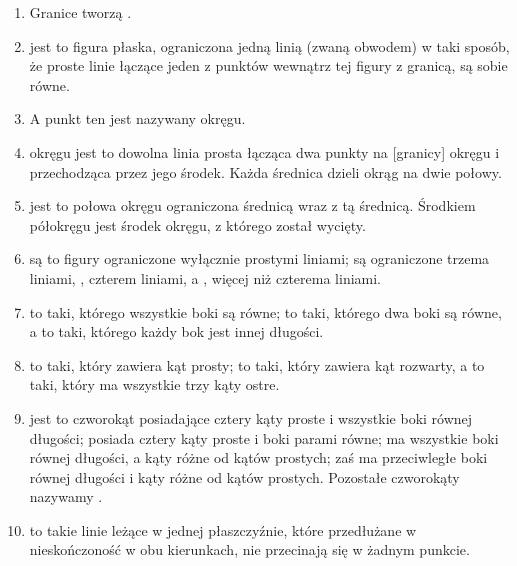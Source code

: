 \documentclass[12pt, a4paper]{scrartcl}
\begin{document}
\begin{enumerate}
    \item \mkdef Granice tworzą .
    \item \mkdef
         jest to figura płaska, ograniczona jedną linią (zwaną
        obwodem) w taki sposób, że proste linie łączące jeden z punktów wewnątrz
        tej figury z granicą, są sobie równe.
    \item \mkdef A punkt ten jest nazywany  okręgu.
    \item \mkdef
         okręgu jest to dowolna linia prosta łącząca dwa punkty
        na [granicy] okręgu i przechodząca przez jego środek. Każda średnica
        dzieli okrąg na dwie połowy.
    \item \mkdef
         jest to połowa okręgu ograniczona średnicą wraz z tą
        średnicą. Środkiem półokręgu jest środek okręgu, z którego został
        wycięty.
    \item \mkdef
         są to figury ograniczone wyłącznie
        prostymi liniami;  są ograniczone trzema liniami,
        , czterem liniami, a , więcej niż
        czterema liniami.
    \item \mkdef
         to taki, którego wszystkie boki są równe;
         to taki, którego dwa boki są równe,
        a  to taki, którego każdy bok jest innej długości.
    \item \mkdef
         to taki, który zawiera kąt prosty;
         to taki, który zawiera kąt rozwarty,
        a  to taki, który ma wszystkie trzy kąty ostre.
    \item \mkdef
         jest to czworokąt posiadające cztery kąty proste
        i wszystkie boki równej długości;  posiada cztery
        kąty proste i boki parami równe;  ma wszystkie boki równej
        długości, a kąty różne od kątów prostych;  zaś
        ma przeciwległe boki równej długości i kąty różne od kątów prostych.
        Pozostałe czworokąty nazywamy .
    \item \mkdef
         to takie linie leżące w jednej płaszczyźnie,
        które przedłużane w nieskończoność w obu kierunkach, nie przecinają
        się w żadnym punkcie.
\end{enumerate}
\end{document}
